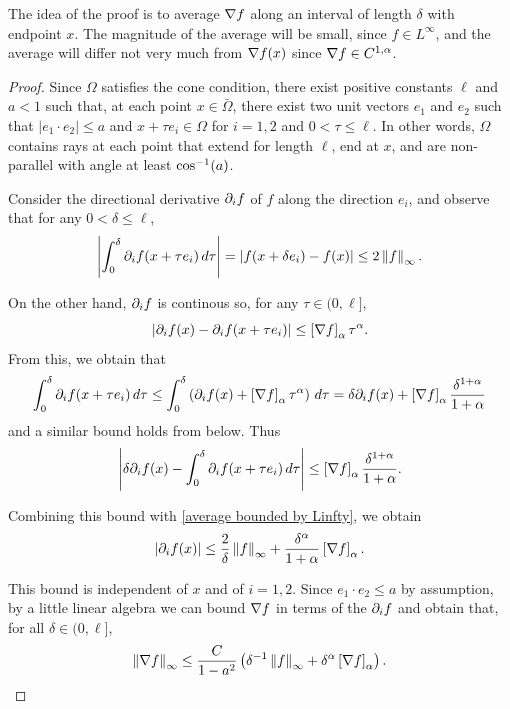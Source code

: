 The idea of the proof is to average $\nabla f$ along an interval of length $\delta$ with endpoint $x$.  The magnitude of the average will be small, since $f \in L^\infty$, and the average will differ not very much from $\nabla f(x)$ since $\nabla f \in C^{1,\alpha}$.  

\begin{proof}
Since $\Omega$ satisfies the cone condition, there exist positive constants $\ell$ and $a<1$ such that, at each point $x \in \bar{\Omega}$, there exist two unit vectors $e_1$ and $e_2$ such that $|e_1\cdot e_2| \leq a$ and $x + \tau e_i \in \Omega$ for $i=1,2$ and $0 < \tau \leq \ell$.  In other words, $\Omega$ contains rays at each point that extend for length $\ell$, end at $x$, and are non-parallel with angle at least $\cos^{-1}(a)$.  

Consider the directional derivative $\partial_i f$ of $f$ along the direction $e_i$, and observe that for any $0 < \delta \leq \ell$,
\begin{equation} \label{average bounded by Linfty} \left\lvert \int_0^\delta \partial_i f(x + \tau e_i) \,d\tau \right\rvert = \left\lvert f(x+\delta e_i) - f(x) \right\rvert \leq 2 \left\lVert f\right\rVert_\infty. \end{equation}

On the other hand, $\partial_i f$ is continous so, for any $\tau \in (0,\ell]$,
\[ \left\lvert \partial_i f(x) - \partial_i f(x+\tau e_i) \right\rvert \leq \left[ \nabla f \right]_\alpha \tau^\alpha. \]
From this, we obtain that
\[ \int_0^\delta \partial_i f(x + \tau e_i) \,d\tau \leq \int_0^\delta \left( \partial_i f(x) + \left[ \nabla f \right]_\alpha \tau^\alpha  \right) \,d\tau = \delta \partial_i f(x) + \left[ \nabla f \right]_\alpha \frac{\delta^{1+\alpha}}{1+\alpha} \]
and a similar bound holds from below.  Thus
\[ \left\lvert  \delta \partial_i f(x) - \int_0^\delta \partial_i f(x + \tau e_i) \,d\tau \right\rvert \leq \left[ \nabla f \right]_\alpha \frac{\delta^{1+\alpha}}{1+\alpha}. \]

Combining this bound with \eqref{average bounded by Linfty}, we obtain
\[ \left\lvert \partial_i f(x) \right\rvert \leq \frac{2}{\delta} \left\lVert f\right\rVert_\infty + \frac{\delta^\alpha}{1+\alpha} \left[ \nabla f \right]_\alpha. \]

This bound is independent of $x$ and of $i=1,2$.  Since $e_1 \cdot e_2 \leq a$ by assumption, by a little linear algebra we can bound $\nabla f$ in terms of the $\partial_i f$ and obtain that, for all $\delta \in (0,\ell]$,
\[ \left\lVert\nabla f\right\rVert_\infty \leq \frac{C}{1-a^2} \left(  \delta^{-1} \left\lVert f\right\rVert_\infty + \delta^\alpha \left[ \nabla f \right]_\alpha  \right). \]

\end{proof}




